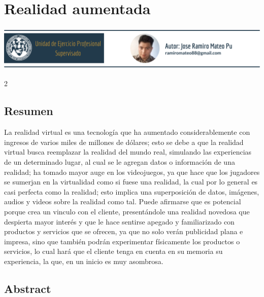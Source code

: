 \documentclass[12pt,spanish,Letterpaper,openany]{book}
\begin{document}
\hypertarget{ramiro}{%
\chapter{Realidad aumentada}\label{ramiro}}

\begin{center}\includegraphics[width=1\linewidth]{images/jMateo_image1} \end{center}

\begin {multicols}{2}

\hypertarget{resumen-4}{%
\section{Resumen}\label{resumen-4}}

La realidad virtual es una tecnología que ha aumentado considerablemente con ingresos de varios miles de millones de dólares; esto se debe a que la realidad virtual busca reemplazar la realidad del mundo real, simulando las experiencias de un determinado lugar, al cual se le agregan datos o información de una realidad; ha tomado mayor auge en los videojuegos, ya que hace que los jugadores se sumerjan en la virtualidad como si fuese una realidad, la cual por lo general es casi perfecta como la realidad; esto implica una superposición de datos, imágenes, audios y videos sobre la realidad como tal. Puede afirmarse que es potencial porque crea un vinculo con el cliente, presentándole una realidad novedosa que despierta mayor interés y que le hace sentirse apegado y familiarizado con productos y servicios que se ofrecen, ya que no solo verán publicidad plana e impresa, sino que también podrán experimentar físicamente los productos o servicios, lo cual hará que el cliente tenga en cuenta en su memoria su experiencia, la que, en un inicio es muy asombrosa.

\hypertarget{abstract-4}{%
\section{Abstract}\label{abstract-4}}


\end{multicols}
\end{document}
